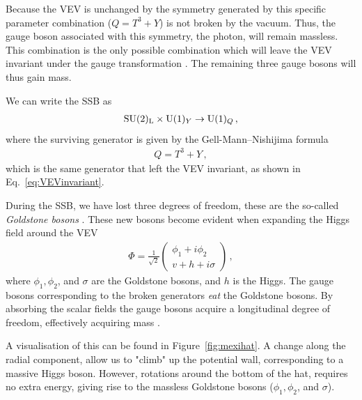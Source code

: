 Because the VEV is unchanged by the symmetry generated by this specific parameter combination ($Q=T^3+Y$) is not broken by the vacuum. Thus, the gauge boson associated with this symmetry, the photon, will remain massless. This combination is the only possible combination which will leave the VEV invariant under the gauge transformation \cite{Peskin:1995ev}. The remaining three gauge bosons will thus gain mass. 

We can write the SSB as
\begin{align}
    \mathrm{SU}(2)_{\mathrm{L}} \times \mathrm{U}(1)_{Y} \rightarrow \mathrm{U}(1)_{Q}\,,
\end{align}
where the surviving generator is given by the Gell-Mann--Nishijima formula \cite{Gell-Mann:1956iqa,Nishijima:1955gxk} 
\begin{align}
    Q=T^3+Y\,,\label{eq:chargedef}
\end{align}
which is the same generator that left the VEV invariant, as shown in Eq.~\eqref{eq:VEVinvariant}. 

During the SSB, we have lost three degrees of freedom, these are the so-called \textit{Goldstone bosons} \cite{Goldstone:1961eq,Goldstone:1962es}. These new bosons become evident when expanding the Higgs field around the VEV \cite{Pernow:2021fvb}
\begin{align}
    \Phi = \frac{1}{\sqrt{2}} \begin{pmatrix} \phi_1+i\phi_2 \\ v + h + i\sigma \end{pmatrix}\,,
\end{align}
where $\phi_1,\phi_2$, and $\sigma$ are the Goldstone bosons, and $h$ is the Higgs. The gauge bosons corresponding to the broken generators \textit{eat} the Goldstone bosons. By absorbing the scalar fields the gauge bosons acquire a longitudinal degree of freedom, effectively acquiring mass \cite{Pernow:2021fvb}. 

A visualisation of this can be found in Figure~\ref{fig:mexihat}. A change along the radial component, allow us to "climb" up the potential wall, corresponding to a massive Higgs boson. However, rotations around the bottom of the hat, requires no extra energy, giving rise to the massless Goldstone bosons ($\phi_1,\phi_2$, and $\sigma$). 

